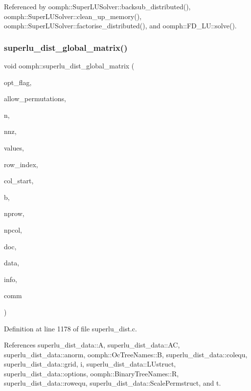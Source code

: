 Referenced by oomph\+::\+Super\+L\+U\+Solver\+::backsub\+\_\+distributed(), oomph\+::\+Super\+L\+U\+Solver\+::clean\+\_\+up\+\_\+memory(), oomph\+::\+Super\+L\+U\+Solver\+::factorise\+\_\+distributed(), and oomph\+::\+F\+D\+\_\+\+L\+U\+::solve().

\mbox{\label{namespaceoomph_a69210c78770d5e7a589b23ca3b821ec1}} 
\subsubsection{\texorpdfstring{superlu\+\_\+dist\+\_\+global\+\_\+matrix()}{superlu\_dist\_global\_matrix()}}
{\footnotesize\ttfamily void oomph\+::superlu\+\_\+dist\+\_\+global\+\_\+matrix (\begin{DoxyParamCaption}\item[{int}]{opt\+\_\+flag,  }\item[{int}]{allow\+\_\+permutations,  }\item[{int}]{n,  }\item[{int}]{nnz,  }\item[{double $\ast$}]{values,  }\item[{int $\ast$}]{row\+\_\+index,  }\item[{int $\ast$}]{col\+\_\+start,  }\item[{double $\ast$}]{b,  }\item[{int}]{nprow,  }\item[{int}]{npcol,  }\item[{int}]{doc,  }\item[{void $\ast$$\ast$}]{data,  }\item[{int $\ast$}]{info,  }\item[{M\+P\+I\+\_\+\+Comm}]{comm }\end{DoxyParamCaption})}



Definition at line 1178 of file superlu\+\_\+dist.\+c.



References superlu\+\_\+dist\+\_\+data\+::A, superlu\+\_\+dist\+\_\+data\+::\+AC, superlu\+\_\+dist\+\_\+data\+::anorm, oomph\+::\+Oc\+Tree\+Names\+::B, superlu\+\_\+dist\+\_\+data\+::colequ, superlu\+\_\+dist\+\_\+data\+::grid, i, superlu\+\_\+dist\+\_\+data\+::\+L\+Ustruct, superlu\+\_\+dist\+\_\+data\+::options, oomph\+::\+Binary\+Tree\+Names\+::R, superlu\+\_\+dist\+\_\+data\+::rowequ, superlu\+\_\+dist\+\_\+data\+::\+Scale\+Permstruct, and t.



